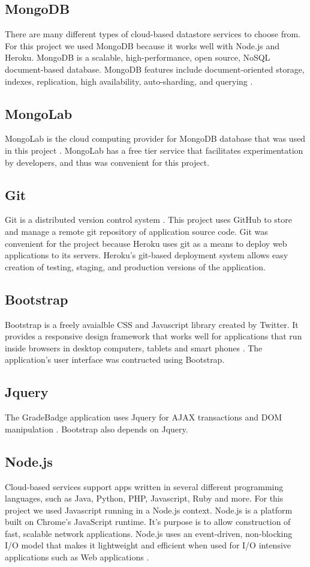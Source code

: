 \subsection{MongoDB}
There are many different types of cloud-based datastore services to choose from. For this project we used MongoDB because it works well with Node.js and Heroku.  MongoDB is a scalable, high-performance, open source, NoSQL document-based database. MongoDB features include document-oriented storage, indexes, replication, high availability, auto-sharding, and querying \cite{mongodb}. 

\subsection{MongoLab}
MongoLab is the cloud computing provider for MongoDB database that was used in this project \cite{mongolab}.  MongoLab has a free tier service that facilitates experimentation by developers, and thus was convenient for this project. 

\subsection{Git}
Git is a distributed version control system \cite{github}.  This project uses GitHub to store and manage a remote git repository of application source code.  Git was convenient for the project because Heroku uses git as a means to deploy web applications to its servers. Heroku's git-based deployment system allows easy creation of testing, staging, and production versions of the application.

\subsection{Bootstrap}
Bootstrap is a freely avaialble CSS and Javascript library created by Twitter.  It provides a responsive design framework that works well for applications that run inside browsers in desktop computers, tablets and smart phones \cite{bootstrap}. The application's user interface was contructed using Bootstrap. 

\subsection{Jquery}
The GradeBadge application uses Jquery for AJAX transactions and DOM manipulation \cite{JQuery}.  Bootstrap also depends on Jquery.

\subsection{Node.js}
Cloud-based services support apps written in several different programming languages, such as Java, Python, PHP, Javascript, Ruby and more. For this project we used Javascript running in a Node.js context. Node.js is a platform built on Chrome's JavaScript runtime.  It's purpose is to allow construction of fast, scalable network applications. Node.js uses an event-driven, non-blocking I/O model that makes it lightweight and efficient when used for I/O intensive applications such as Web applications \cite{nodejs}.

